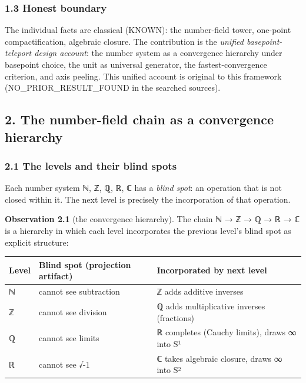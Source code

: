 \documentclass[
]{article}
\begin{document}
\subsubsection{1.3 Honest boundary}\label{honest-boundary}

The individual facts are classical (KNOWN): the number-field tower,
one-point compactification, algebraic closure. The contribution is the
\emph{unified basepoint-teleport design account}: the number system as a
convergence hierarchy under basepoint choice, the unit as universal
generator, the fastest-convergence criterion, and axis peeling. This
unified account is original to this framework (NO\_PRIOR\_RESULT\_FOUND
in the searched sources).

\subsection{2. The number-field chain as a convergence
hierarchy}\label{the-number-field-chain-as-a-convergence-hierarchy}

\subsubsection{2.1 The levels and their blind
spots}\label{the-levels-and-their-blind-spots}

Each number system ℕ, ℤ, ℚ, ℝ, ℂ has a \emph{blind spot}: an operation
that is not closed within it. The next level is precisely the
incorporation of that operation.

\textbf{Observation 2.1} (the convergence hierarchy). The chain ℕ → ℤ →
ℚ → ℝ → ℂ is a hierarchy in which each level incorporates the previous
level's blind spot as explicit structure:

\begin{longtable}[]{@{}
  >{\raggedright\arraybackslash}p{}
  >{\raggedright\arraybackslash}p{}
  >{\raggedright\arraybackslash}p{}@{}}
\toprule\noalign{}
\begin{minipage}[b]{\linewidth}\raggedright
Level
\end{minipage} & \begin{minipage}[b]{\linewidth}\raggedright
Blind spot (projection artifact)
\end{minipage} & \begin{minipage}[b]{\linewidth}\raggedright
Incorporated by next level
\end{minipage} \\
\midrule\noalign{}
\endhead
\bottomrule\noalign{}
\endlastfoot
ℕ & cannot see subtraction & ℤ adds additive inverses \\
ℤ & cannot see division & ℚ adds multiplicative inverses (fractions) \\
ℚ & cannot see limits & ℝ completes (Cauchy limits), draws ∞ into S¹ \\
ℝ & cannot see √-1 & ℂ takes algebraic closure, draws ∞ into S² \\
\end{longtable}
\end{document}
